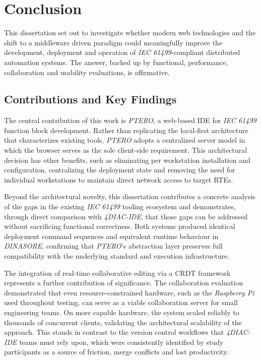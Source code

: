 \chapter{Conclusion} \label{chap:conclusion}
This dissertation set out to investigate whether modern web technologies and the shift to a middleware driven paradigm could meaningfully improve the development, deployment and operation of \textit{IEC 61499}-compliant distributed automation systems. The answer, backed up by functional, performance, collaboration and usability evaluations, is affirmative.

\section{Contributions and Key Findings}
The central contribution of this work is \textit{PTERO}, a web-based \ac{IDE} for \textit{IEC 61499} function block development. Rather than replicating the local-first architecture that characterizes existing tools, \textit{PTERO} adopts a centralized server model in which the browser serves as the sole client-side requirement. This architectural decision has other benefits, such as eliminating per workstation installation and configuration, centralizing the deployment state and removing the need for individual workstations to maintain direct network access to target \acp{RTE}.

Beyond the architectural novelty, this dissertation contributes a concrete analysis of the gaps in the existing \textit{IEC 61499} tooling ecosystem and demonstrates, through direct comparison with \textit{4DIAC-IDE}, that those gaps can be addressed without sacrificing functional correctness. Both systems produced identical deployment command sequences and equivalent runtime behaviour in \textit{DINASORE}, confirming that \textit{PTERO}'s abstraction layer preserves full compatibility with the underlying standard and execution infrastructure.

The integration of real-time collaborative editing via a \ac{CRDT} framework represents a further contribution of significance. The collaboration evaluation demonstrated that even resource-constrained hardware, such as the \textit{Raspberry Pi} used throughout testing, can serve as a viable collaboration server for small engineering teams. On more capable hardware, the system scaled reliably to thousands of concurrent clients, validating the architectural scalability of the approach. This stands in contrast to the version control workflows that \textit{4DIAC-IDE} teams must rely upon, which were consistently identified by study participants as a source of friction, merge conflicts and lost productivity.

